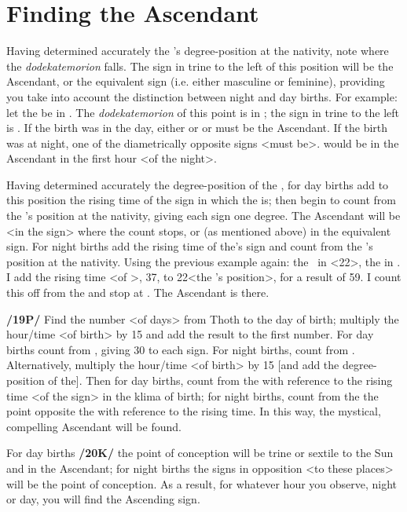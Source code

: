 \section{Finding the Ascendant}
Having determined accurately the \Sun’s degree-position at the nativity, note where the \textsl{dodekatemorion} falls. The sign in trine to the left of this position will be the Ascendant, or the equivalent sign (i.e. either masculine or feminine), providing you take into account the distinction between night and day births. For example: let the \Sun\xspace be in \Aquarius\xspace 22\deg. The \textsl{dodekatemorion} of this point is in \Scorpio; the sign in trine to the left is \Pisces. If the birth was in the day, either \Pisces\xspace or \Taurus\xspace or \Cancer\xspace must be the Ascendant. If the birth was at night, one of the diametrically opposite signs <must be>. \Virgo\xspace would be in the Ascendant in the first hour <of the night>.

Having determined accurately the degree-position of the \Sun, for day births add to this position the rising time of the sign in which the \Sun\xspace is; then begin to count from the \Moon’s position at the nativity, giving each sign one degree. The Ascendant will be <in the sign> where the count stops, or (as mentioned above) in the equivalent sign. For night births add the rising time of the\Moon’s sign and count from the \Sun’s position at the nativity. Using the previous example again: the \Sun\, in \Aquarius\xspace <22\deg>, the \Moon\xspace in
\Scorpio. I add the rising time <of \Scorpio>, 37, to 22\deg <the \Sun’s position>, for a result of 59. I count this off from the \Sun\xspace and stop at \Virgo. The Ascendant is there.

\textbf{/19P/} Find the number <of days> from Thoth to the day of birth; multiply the hour/time <of birth> by 15 and add the result to the first number. For day births count from \Virgo, giving 30 to each sign. For night births, count from \Pisces.
Alternatively, multiply the hour/time <of birth> by 15 [and add the degree-position of the\Sun]. Then for day births, count from the \Sun\xspace with reference to the rising time <of the sign> in the klima of birth; for night births, count from the the point opposite the \Sun\xspace with reference to the rising time. In this way, the mystical, compelling Ascendant will be found. 

For day births \textbf{/20K/} the point of conception will be trine or sextile to the Sun and in the Ascendant; for night births the signs in opposition <to these places> will be the point of conception. As a result, for whatever hour you observe, night or day, you will find the Ascending sign.

